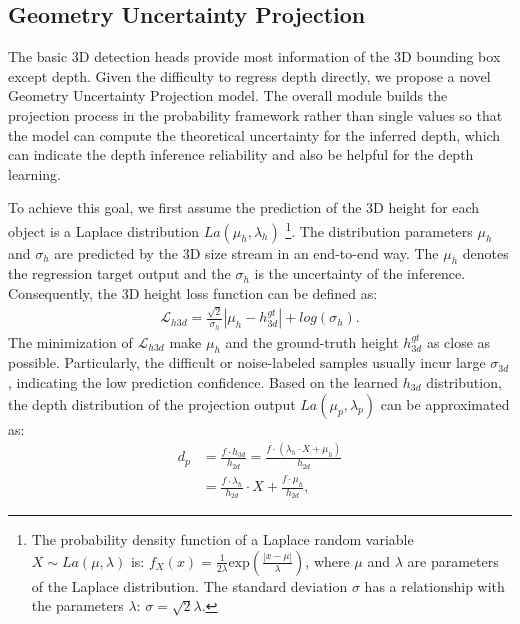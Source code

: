 \documentclass[10pt,twocolumn,letterpaper]{article}
\begin{document}
\subsection{Geometry Uncertainty Projection}
The basic 3D detection heads provide most information of the 3D bounding box except depth. Given the difficulty to regress depth directly, we propose a novel Geometry Uncertainty Projection model. The overall module builds the projection process in the probability framework rather than single values so that the model can compute the theoretical uncertainty for the inferred depth, which can indicate the depth inference reliability and also be helpful for the depth learning. 

To achieve this goal, we first assume the prediction of the 3D height for each object is a Laplace distribution $La(\mu_{h},\lambda_{h})$ \footnote{The probability density function of a Laplace random variable $X\sim La(\mu,\lambda)$ is: $ f_X(x)= \frac{1}{2\lambda}\text{exp}(\frac{|x-\mu|}{\lambda})$,
where $\mu$ and $\lambda$ are parameters of the Laplace distribution. The standard deviation $\sigma$ has a relationship with the parameters $\lambda$: $\sigma = \sqrt{2}\lambda$. 
}. The distribution parameters $\mu_{h}$ and $\sigma_{h}$ are predicted by the 3D size stream in an end-to-end way. The $\mu_{h}$ denotes the regression target output and the $\sigma_{h}$ is the uncertainty of the inference. Consequently, the 3D height loss function can be defined as:
\begin{equation}
\begin{aligned}
    \mathcal{L}_{h3d} =
    \frac{\sqrt{2}}{\sigma_{h}}|\mu_{h}-h^{gt}_{3d}|+log(\sigma_{h}).
\end{aligned}
\end{equation}
The minimization of $\mathcal{L}_{h3d}$ make $\mu_{h}$ and the ground-truth height $h^{gt}_{3d}$ as close as possible. Particularly, the difficult or noise-labeled samples usually incur large $\sigma_{3d}$, indicating the low prediction confidence. Based on the learned $h_{3d}$ distribution, the depth distribution of the projection output $La(\mu_{p},\lambda_{p})$ can be approximated as:
\begin{equation}
\begin{aligned}
    d_{p} &= \frac{f\cdot h_{3d}}{h_{2d}}
    = \frac{f\cdot (\lambda_{h}\cdot X + \mu_{h})}{h_{2d}}\\
    & = \frac{f\cdot \lambda_{h}}{h_{2d}}\cdot X + \frac{f\cdot \mu_{h}}{h_{2d}},
\end{aligned}
\end{equation}
\end{document}

